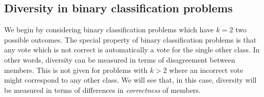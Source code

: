 \documentclass[../main.tex]{subfiles}
\begin{document}
\subsection{Diversity in binary classification problems}

We begin by considering binary classification problems which have $k=2$ two possible outcomes. 
The special property of binary classification problems is that any vote which is not correct is automatically a vote for the single other class. In other words, diversity can be measured in terms of disagreement between members. 
This is not given for problems with $k>2$ where an incorrect vote might correspond to any other class. We will see that, in this case, diversity will be measured in terms of differences in \textit{correctness} of members.

\end{document}
